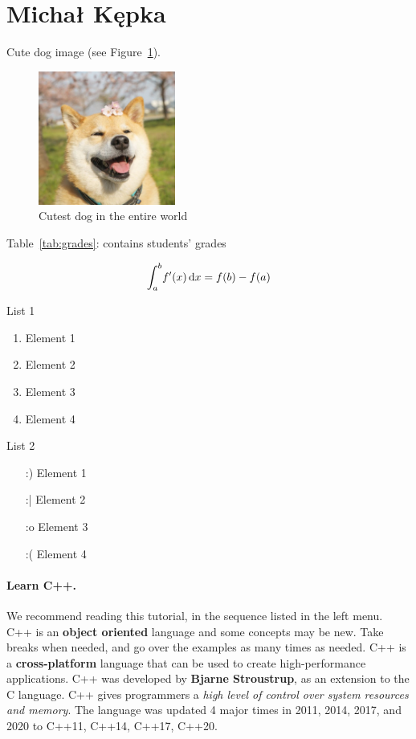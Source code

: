 \section{Michał Kępka}
\label{sec:mkepka}

Cute dog image (see Figure~\ref{fig:dog}).

\begin{figure}[h]
    \centering
    \includegraphics[width=0.4\textwidth]{pictures/dog.jpeg}
    \caption{Cutest dog in the entire world}
    \label{fig:dog}
\end{figure}

Table~\ref{tab:grades}: contains students' grades



\begin{equation}
    \centering
    \int_a^b \! f'(x) \, \mathrm{d}x = f(b) - f(a)
    \label{mat:calculus_equation}
\end{equation}

List 1
\begin{enumerate}
    \item Element 1
    \item Element 2
    \item Element 3
    \item Element 4
\end{enumerate}
\vspace{20pt}

List 2
\begin{itemize}
    \item[:)] Element 1
    \item[:|] Element 2
    \item[:o] Element 3
    \item[:(] Element 4
\end{itemize}

\paragraph{Learn C++.}
We recommend reading this tutorial, in the sequence listed in the left menu.
C++ is an \textbf{object oriented} language and some concepts may be new. Take breaks when needed, and go over the examples as many times as needed.
C++ is a \textbf{cross-platform} language that can be used to create high-performance applications.
C++ was developed by \textbf{Bjarne Stroustrup}, as an extension to the C language.
C++ gives programmers a \textit{high level of control over system resources and memory}.
The language was updated 4 major times in 2011, 2014, 2017, and 2020 to C++11, C++14, C++17, C++20.

